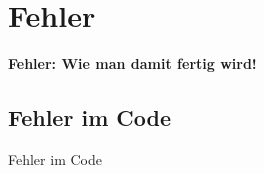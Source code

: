 \documentclass["WS\space 16-17\space -\space LaTeX-Kurs\space -\space Praesentation\space -\space 4.tex"]{subfiles}
\begin{document}
\section{Fehler}
\begin{frame}[c]
	\begin{center}
		\LARGE \textbf{Fehler: Wie man damit fertig wird!}
	\end{center}
\end{frame}
\subsection{Fehler im Code}
\begin{frame}[c]
	\begin{center}
		\large Fehler im Code
	\end{center}
\end{frame}
\end{document}
